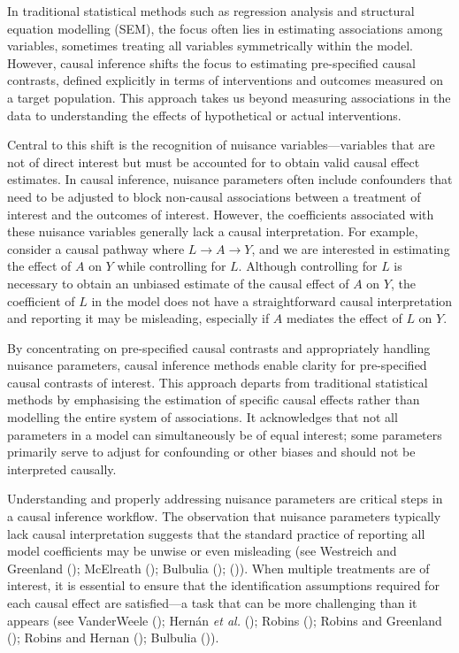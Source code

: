 \documentclass[
  singlecolumn]{article}
\begin{document}
In traditional statistical methods such as regression analysis and
structural equation modelling (SEM), the focus often lies in estimating
associations among variables, sometimes treating all variables
symmetrically within the model. However, causal inference shifts the
focus to estimating pre-specified causal contrasts, defined explicitly
in terms of interventions and outcomes measured on a target population.
This approach takes us beyond measuring associations in the data to
understanding the effects of hypothetical or actual interventions.

Central to this shift is the recognition of nuisance
variables---variables that are not of direct interest but must be
accounted for to obtain valid causal effect estimates. In causal
inference, nuisance parameters often include confounders that need to be
adjusted to block non-causal associations between a treatment of
interest and the outcomes of interest. However, the coefficients
associated with these nuisance variables generally lack a causal
interpretation. For example, consider a causal pathway where
\(L \to A \to Y\), and we are interested in estimating the effect of
\(A\) on \(Y\) while controlling for \(L\). Although controlling for
\(L\) is necessary to obtain an unbiased estimate of the causal effect
of \(A\) on \(Y\), the coefficient of \(L\) in the model does not have a
straightforward causal interpretation and reporting it may be
misleading, especially if \(A\) mediates the effect of \(L\) on \(Y\).

By concentrating on pre-specified causal contrasts and appropriately
handling nuisance parameters, causal inference methods enable clarity
for pre-specified causal contrasts of interest. This approach departs
from traditional statistical methods by emphasising the estimation of
specific causal effects rather than modelling the entire system of
associations. It acknowledges that not all parameters in a model can
simultaneously be of equal interest; some parameters primarily serve to
adjust for confounding or other biases and should not be interpreted
causally.

Understanding and properly addressing nuisance parameters are critical
steps in a causal inference workflow. The observation that nuisance
parameters typically lack causal interpretation suggests that the
standard practice of reporting all model coefficients may be unwise or
even misleading (see Westreich and Greenland
(); McElreath
(); Bulbulia
();
()).
When multiple treatments are of interest, it is essential to ensure that
the identification assumptions required for each causal effect are
satisfied---a task that can be more challenging than it appears (see
VanderWeele (); Hernán \emph{et al.}
();
Robins (); Robins and Greenland
(); Robins and Hernan
(); Bulbulia
()).
\end{document}
